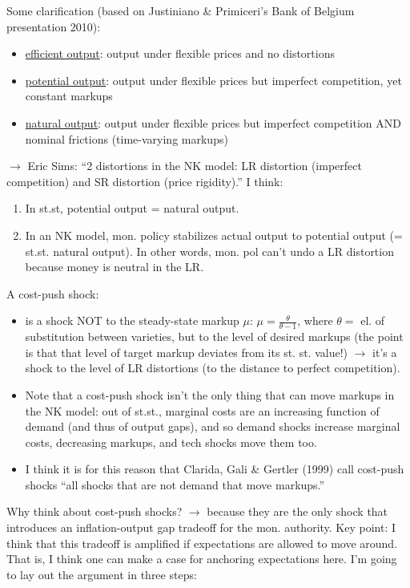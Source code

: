 \documentclass[11pt]{article}
\renewcommand{\[}{\begin{equation}}
\renewcommand{\]}{\end{equation}}
\begin{document}
Some clarification (based on Justiniano \& Primiceri's Bank of Belgium presentation 2010):
\begin{itemize}
\item \underline{efficient output}: output under flexible prices and no distortions
\item \underline{potential output}: output under flexible prices but imperfect competition, yet constant markups
\item \underline{natural output}: output under flexible prices but imperfect competition AND nominal frictions (time-varying markups)
\end{itemize}
$\rightarrow$ Eric Sims: ``2 distortions in the NK model: LR distortion (imperfect competition) and SR distortion (price rigidity).''
I think:
\begin{enumerate}
\item In st.st, potential output = natural output. 
\item In an NK model, mon. policy stabilizes actual output to potential output (= st.st. natural output). In other words, mon. pol can't undo a LR distortion because money is neutral in the LR.
\end{enumerate}
A cost-push shock:
\begin{itemize}
\item is a shock NOT to the steady-state markup $\mu$: $\mu = \frac{\theta}{\theta-1}$, where $\theta =$ el. of substitution between varieties, but to the level of desired markups (the point is that that level of target markup deviates from its st. st. value!) $\rightarrow$ it's a shock to the level of LR distortions (to the distance to perfect competition).
\item Note that a cost-push shock isn't the only thing that can move markups in the NK model: out of st.st., marginal costs are an increasing function of demand (and thus of output gaps), and so demand shocks increase marginal costs, decreasing markups, and tech shocks move them too.
\item I think it is for this reason that Clarida, Gali \& Gertler (1999) call cost-push shocks ``all shocks that are not demand that move markups.''
\end{itemize}
Why think about cost-push shocks? $\rightarrow$ because they are the only shock that introduces an inflation-output gap tradeoff for the mon. authority. Key point: I think that this tradeoff is amplified if expectations are allowed to move around. That is, I think one can make a case for anchoring expectations here. I'm going to lay out the argument in three steps:
\end{document}
